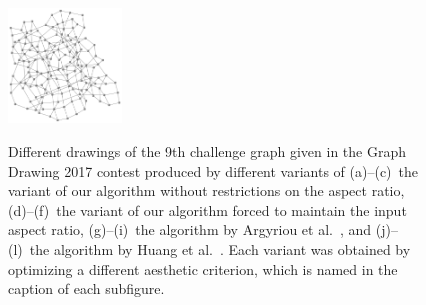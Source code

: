 \documentclass{comjnl}
\begin{document}
\begin{figure}[htbp]
{	\includegraphics[width=0.27\textwidth]{graph9-huang-total}}
	\caption{Different drawings of the 9th challenge graph given in the Graph Drawing 2017 contest produced by different variants of
	(a)--(c)~the variant of our algorithm without restrictions on the aspect ratio, 
	(d)--(f)~the variant of our algorithm forced to maintain the input aspect ratio,
	(g)--(i)~the algorithm by Argyriou et al.~\cite{DBLP:journals/cj/ArgyriouBS13}, and
	(j)--(l)~the algorithm by Huang et al.~\cite{DBLP:journals/vlc/HuangEHL13}.
	Each variant was obtained by optimizing a different aesthetic criterion, which is named in the caption of each subfigure.}
	\label{fig:graph9}
\end{figure}
\end{document}
